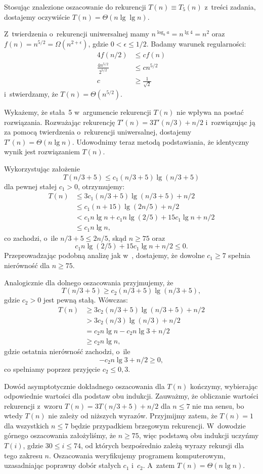 Stosując znalezione oszacowanie do rekurencji $T(n)\equiv T_5(n)$ z~treści zadania, dostajemy oczywiście $T(n)=\Theta(n\lg\lg n)$.

\subproblem %
Z~twierdzenia o~rekurencji uniwersalnej mamy $n^{\log_ba}=n^{\lg4}=n^2$ oraz $f(n)=n^{5/2}=\Omega(n^{2+\epsilon})$, gdzie $0<\epsilon\le1/2$. Badamy warunek regularności:
\begin{align*}
	4f(n/2) &\le cf(n) \\
	\frac{4n^{5/2}}{2^{5/2}} &\le cn^{5/2} \\
	c &\ge \frac{1}{\sqrt{2}}
\end{align*}
i~stwierdzamy, że $T(n)=\Theta(n^{5/2})$.

\subproblem %
Wykażemy, że stała~5 w~argumencie rekurencji $T(n)$ nie wpływa na postać rozwiązania. Rozważając rekurencję $T'(n)=3T'(n/3)+n/2$ i~rozwiązując ją za pomocą twierdzenia o~rekurencji uniwersalnej, dostajemy $T'(n)=\Theta(n\lg n)$. Udowodnimy teraz metodą podstawiania, że identyczny wynik jest rozwiązaniem $T(n)$.

Wykorzystując założenie
\[
	T(n/3+5) \le c_1(n/3+5)\lg(n/3+5)
\]
dla pewnej stałej $c_1>0$, otrzymujemy:
\begin{align*}
	T(n) &\le 3c_1(n/3+5)\lg(n/3+5)+n/2 \\
	&\le c_1(n+15)\lg(2n/5)+n/2 \\
	&< c_1n\lg n+c_1n\lg(2/5)+15c_1\!\lg n+n/2 \\
	&\le c_1n\lg n,
\end{align*}
co zachodzi, o~ile $n/3+5\le2n/5$, skąd $n\ge75$ oraz
\[
	c_1n\lg(2/5)+15c_1\!\lg n+n/2 \le 0.
\]
Przeprowadzając podobną analizę jak w~, dostajemy, że dowolne $c_1\ge7$ spełnia nierówność dla $n\ge75$.

Analogicznie dla dolnego oszacowania przyjmujemy, że
\[
	T(n/3+5) \ge c_2(n/3+5)\lg(n/3+5),
\]
gdzie $c_2>0$ jest pewną stałą. Wówczas:
\begin{align*}
	T(n) &\ge 3c_2(n/3+5)\lg(n/3+5)+n/2 \\
	&> 3c_2(n/3)\lg(n/3)+n/2 \\
	&= c_2n\lg n-c_2n\lg3+n/2 \\
	&\ge c_2n\lg n,
\end{align*}
gdzie ostatnia nierówność zachodzi, o~ile
\[
	-c_2n\lg3+n/2 \ge 0,
\]
co spełniamy poprzez przyjęcie $c_2\le0{,}3$.

Dowód asymptotycznie dokładnego oszacowania dla $T(n)$ kończymy, wybierając odpowiednie wartości dla podstaw obu indukcji. Zauważmy, że obliczanie wartości rekurencji z~wzoru $T(n)=3T(n/3+5)+n/2$ dla $n\le7$ nie ma sensu, bo wtedy $T(n)$ nie zależy od niższych wyrazów. Przyjmijmy zatem, że $T(n)=1$ dla wszystkich $n\le7$ będzie przypadkiem brzegowym rekurencji. W~dowodzie górnego oszacowania założyliśmy, że $n\ge75$, więc podstawą obu indukcji uczyńmy $T(i)$, gdzie $30\le i\le 74$, od których bezpośrednio zależą wyrazy rekursji dla tego zakresu $n$. Oszacowania weryfikujemy programem komputerowym, uzasadniając poprawny dobór stałych $c_1$ i~$c_2$. A~zatem $T(n)=\Theta(n\lg n)$.

